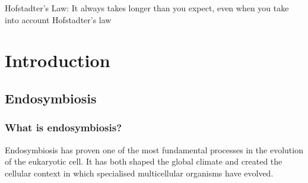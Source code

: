 \graphicspath{{chapters/1.Introduction/figures/}}

\begin{savequote}[75mm]
Hofstadter's Law: It always takes longer than you expect, even when you take into account Hofstadter's law
\end{savequote}

\chapter{Introduction}


\section{Endosymbiosis}

\subsection{What is endosymbiosis?}

Endosymbiosis has proven one of the most fundamental processes in the evolution of the
eukaryotic cell. It has both shaped the global climate and
created the cellular context in which specialised multicellular organisms have evolved.

